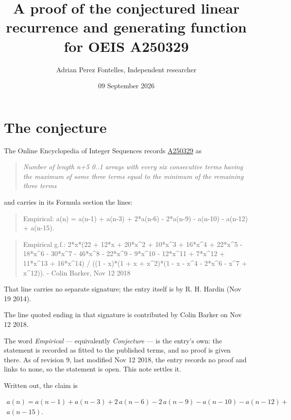 \documentclass[11pt]{article}
\title{A proof of the conjectured linear recurrence and generating function for OEIS A250329}
\author{Adrian Perez Fontelles, Independent researcher}
\date{09 September 2026}
\theoremstyle{definition}
\begin{document}
\maketitle
\section{The conjecture}

The Online Encyclopedia of Integer Sequences records \href{https://oeis.org/A250329}{A250329} as

\begin{quote}\itshape Number of length n+5 0..1 arrays with every six consecutive terms having the maximum of some three terms equal to the minimum of the remaining three terms\end{quote}

and carries in its Formula section the lines:

\begin{quote}\ttfamily Empirical: a(n) = a(n-1) + a(n-3) + 2*a(n-6) - 2*a(n-9) - a(n-10) - a(n-12) + a(n-15).\end{quote}

\begin{quote}\ttfamily Empirical g.f.: 2*x*(22 + 12*x + 20*x\textasciicircum{}2 + 10*x\textasciicircum{}3 + 16*x\textasciicircum{}4 + 22*x\textasciicircum{}5 - 18*x\textasciicircum{}6 - 30*x\textasciicircum{}7 - 46*x\textasciicircum{}8 - 22*x\textasciicircum{}9 - 9*x\textasciicircum{}10 - 12*x\textasciicircum{}11 + 7*x\textasciicircum{}12 + 11*x\textasciicircum{}13 + 16*x\textasciicircum{}14) / ((1 - x)*(1 + x + x\textasciicircum{}2)*(1 - x - x\textasciicircum{}4 - 2*x\textasciicircum{}6 - x\textasciicircum{}7 + x\textasciicircum{}12)). - Colin Barker, Nov 12 2018\end{quote}

That line carries no separate signature; the entry itself is by R. H. Hardin (Nov 19 2014).

The line quoted ending in that signature is contributed by Colin Barker on Nov 12 2018.

The word {\itshape Empirical} --- equivalently {\itshape Conjecture} --- is the entry's own: the statement is recorded as fitted to the published terms, and no proof is given there. As of revision 9, last modified Nov 12 2018, the entry records no proof and links to none, so the statement is open. This note settles it.

Written out, the claim is

\begin{multline*} a(n) = a(n-1) + a(n-3) + 2\,a(n-6) - 2\,a(n-9) - a(n-10) - a(n-12) + \\ a(n-15). \end{multline*}
\end{document}
